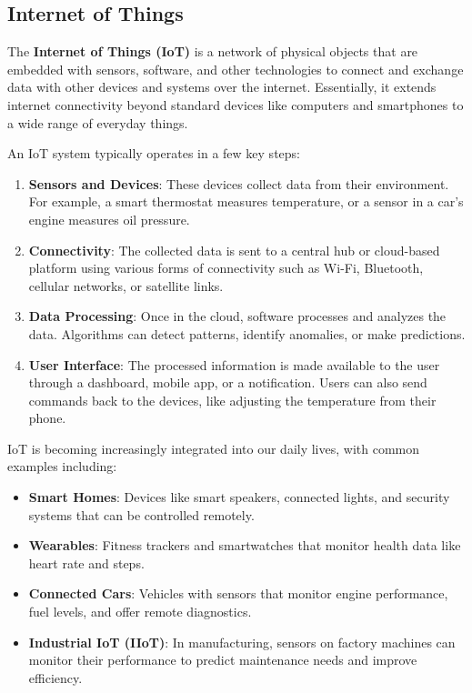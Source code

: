\documentclass{article}
\begin{document}
\subsection*{Internet of Things}
The \textbf{Internet of Things (IoT)} is a network of physical objects that are embedded with sensors, software, and other technologies to connect and exchange data with other devices and systems over the internet. Essentially, it extends internet connectivity beyond standard devices like computers and smartphones to a wide range of everyday things.

An IoT system typically operates in a few key steps:

\begin{enumerate}
    \item \textbf{Sensors and Devices}: These devices collect data from their environment. For example, a smart thermostat measures temperature, or a sensor in a car's engine measures oil pressure.
    \item \textbf{Connectivity}: The collected data is sent to a central hub or cloud-based platform using various forms of connectivity such as Wi-Fi, Bluetooth, cellular networks, or satellite links.
    \item \textbf{Data Processing}: Once in the cloud, software processes and analyzes the data. Algorithms can detect patterns, identify anomalies, or make predictions.
    \item \textbf{User Interface}: The processed information is made available to the user through a dashboard, mobile app, or a notification. Users can also send commands back to the devices, like adjusting the temperature from their phone.
\end{enumerate}

IoT is becoming increasingly integrated into our daily lives, with common examples including:

\begin{itemize}
    \item \textbf{Smart Homes}: Devices like smart speakers, connected lights, and security systems that can be controlled remotely.
    \item \textbf{Wearables}: Fitness trackers and smartwatches that monitor health data like heart rate and steps.
    \item \textbf{Connected Cars}: Vehicles with sensors that monitor engine performance, fuel levels, and offer remote diagnostics.
    \item \textbf{Industrial IoT (IIoT)}: In manufacturing, sensors on factory machines can monitor their performance to predict maintenance needs and improve efficiency.
\end{itemize}
\end{document}
